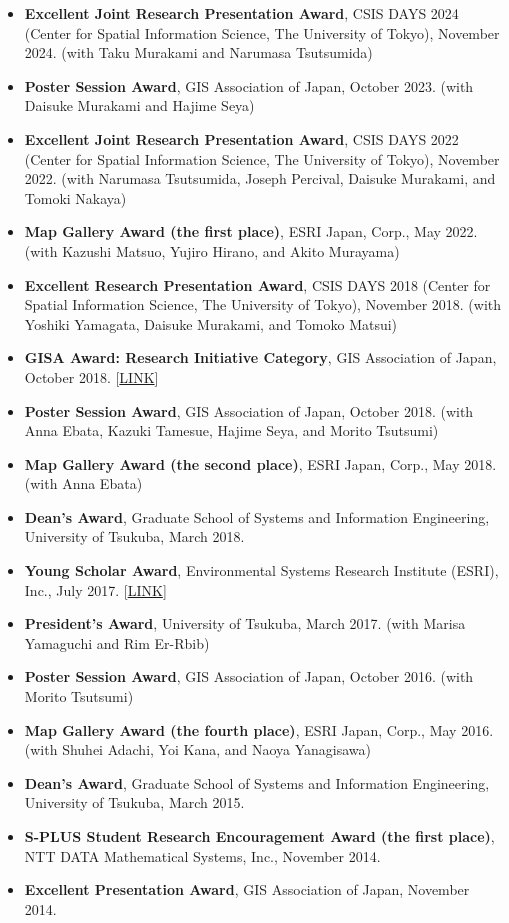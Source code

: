 \documentclass[
]{book}
\providecommand{\tightlist}{%
  \setlength{\itemsep}{0pt}\setlength{\parskip}{0pt}}
\begin{document}
\begin{itemize}
\tightlist
\item
  \textbf{Excellent Joint Research Presentation Award}, CSIS DAYS 2024 (Center for Spatial Information Science, The University of Tokyo), November 2024.
  (with Taku Murakami and Narumasa Tsutsumida)
\item
  \textbf{Poster Session Award}, GIS Association of Japan, October 2023.
  (with Daisuke Murakami and Hajime Seya)
\item
  \textbf{Excellent Joint Research Presentation Award}, CSIS DAYS 2022 (Center for Spatial Information Science, The University of Tokyo), November 2022.
  (with Narumasa Tsutsumida, Joseph Percival, Daisuke Murakami, and Tomoki Nakaya)
\item
  \textbf{Map Gallery Award (the first place)}, ESRI Japan, Corp., May 2022.
  (with Kazushi Matsuo, Yujiro Hirano, and Akito Murayama)
\item
  \textbf{Excellent Research Presentation Award}, CSIS DAYS 2018 (Center for Spatial Information Science, The University of Tokyo), November 2018.
  (with Yoshiki Yamagata, Daisuke Murakami, and Tomoko Matsui)
\item
  \textbf{GISA Award: Research Initiative Category}, GIS Association of Japan, October 2018. {[}\href{https://www.gisa-japan.org/content/files/nl108.pdf}{LINK}{]}
\item
  \textbf{Poster Session Award}, GIS Association of Japan, October 2018.
  (with Anna Ebata, Kazuki Tamesue, Hajime Seya, and Morito Tsutsumi)
\item
  \textbf{Map Gallery Award (the second place)}, ESRI Japan, Corp., May 2018.
  (with Anna Ebata)
\item
  \textbf{Dean's Award}, Graduate School of Systems and Information Engineering, University of Tsukuba, March 2018.
\item
  \textbf{Young Scholar Award}, Environmental Systems Research Institute (ESRI), Inc., July 2017. {[}\href{https://www.esrij.com/cgi-bin/wp/wp-content/uploads/2017/01/YSA-Taiken2017.pdf}{LINK}{]}
\item
  \textbf{President's Award}, University of Tsukuba, March 2017.
  (with Marisa Yamaguchi and Rim Er-Rbib)
\item
  \textbf{Poster Session Award}, GIS Association of Japan, October 2016.
  (with Morito Tsutsumi)
\item
  \textbf{Map Gallery Award (the fourth place)}, ESRI Japan, Corp., May 2016.
  (with Shuhei Adachi, Yoi Kana, and Naoya Yanagisawa)
\item
  \textbf{Dean's Award}, Graduate School of Systems and Information Engineering, University of Tsukuba, March 2015.
\item
  \textbf{S-PLUS Student Research Encouragement Award (the first place)}, NTT DATA Mathematical Systems, Inc., November 2014.
\item
  \textbf{Excellent Presentation Award}, GIS Association of Japan, November 2014.
\end{itemize}
\end{document}
